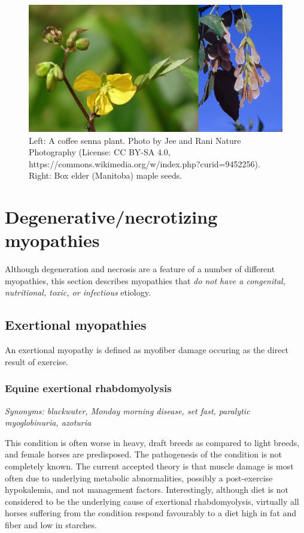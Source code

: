 \documentclass[openany]{book}
\begin{document}
\begin{figure}

{\centering \includegraphics[width=0.6\linewidth]{images/plants} 

}

\caption{Left: A coffee senna plant. Photo by Jee and Rani Nature Photography (License: CC BY-SA 4.0, https://commons.wikimedia.org/w/index.php?curid=9452256). Right: Box elder (Manitoba) maple seeds.}\label{fig:plants}
\end{figure}

\chapter{Degenerative/necrotizing
myopathies}\label{degenerativenecrotizing-myopathies}

Although degeneration and necrosis are a feature of a number of
different myopathies, this section describes myopathies that \emph{do
not have a congenital, nutritional, toxic, or infectious} etiology.

\section{Exertional myopathies}\label{exertional-myopathies}

An exertional myopathy is defined as myofiber damage occuring as the
direct result of exercise.

\subsection{Equine exertional
rhabdomyolysis}\label{equine-exertional-rhabdomyolysis}

\emph{Synonyms: blackwater, Monday morning disease, set fast, paralytic
myoglobinuria, azoturia}

This condition is often worse in heavy, draft breeds as compared to
light breeds, and female horses are predisposed. The pathogenesis of the
condition is not completely known. The current accepted theory is that
muscle damage is most often due to underlying metabolic abnormalities,
possibly a post-exercise hypokalemia, and not management factors.
Interestingly, although diet is not considered to be the underlying
cause of exertional rhabdomyolysis, virtually all horses suffering from
the condition respond favourably to a diet high in fat and fiber and low
in starches.
\end{document}
